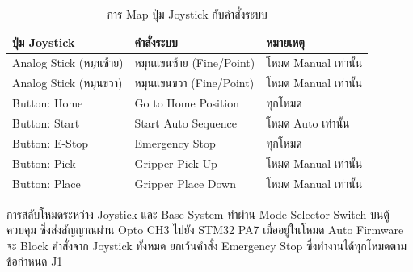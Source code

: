 \begin{table}[H]
  \centering
  \caption{การ Map ปุ่ม Joystick กับคำสั่งระบบ}
  \label{tab:joystick_map}
  \begin{tabular}{lll}
    \toprule
    ปุ่ม Joystick & คำสั่งระบบ & หมายเหตุ \\
    \midrule
    Analog Stick (หมุนซ้าย)  & หมุนแขนซ้าย (Fine/Point) & โหมด Manual เท่านั้น \\
    Analog Stick (หมุนขวา)  & หมุนแขนขวา (Fine/Point) & โหมด Manual เท่านั้น \\
    Button: Home            & Go to Home Position      & ทุกโหมด \\
    Button: Start           & Start Auto Sequence      & โหมด Auto เท่านั้น \\
    Button: E-Stop          & Emergency Stop           & ทุกโหมด \\
    Button: Pick            & Gripper Pick Up          & โหมด Manual เท่านั้น \\
    Button: Place           & Gripper Place Down       & โหมด Manual เท่านั้น \\
    \bottomrule
  \end{tabular}
\end{table}

การสลับโหมดระหว่าง Joystick และ Base System
ทำผ่าน Mode Selector Switch บนตู้ควบคุม
ซึ่งส่งสัญญาณผ่าน Opto CH3 ไปยัง STM32 PA7
เมื่ออยู่ในโหมด Auto Firmware จะ Block คำสั่งจาก Joystick ทั้งหมด
ยกเว้นคำสั่ง Emergency Stop ซึ่งทำงานได้ทุกโหมดตามข้อกำหนด J1

%

